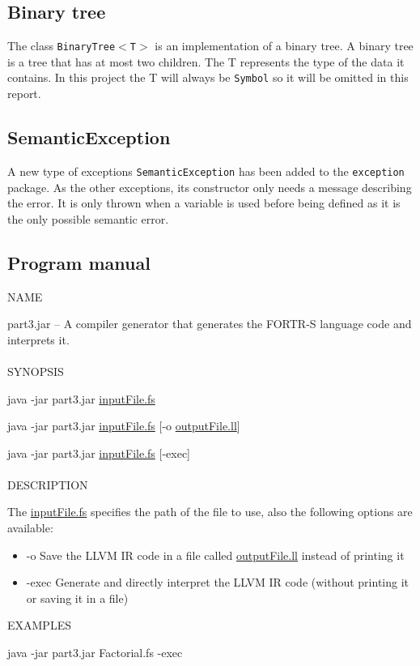 \documentclass{article}
\begin{document}
\subsection{Binary tree}
The class \texttt{BinaryTree$<$T$>$} is an implementation of a binary tree. A binary tree is a tree that has at most two children. The T represents the type of the data it contains. In this project the T will always be \texttt{Symbol} so it will be omitted in this report.

\subsection{SemanticException}
A new type of exceptions \texttt{SemanticException} has been added to the \texttt{exception} package. As the other exceptions, its constructor only needs a message describing the error. It is only thrown when a variable is used before being defined as it is the only possible semantic error. 

\subsection{Program manual}
\noindent NAME

part3.jar -- A compiler generator that generates the FORTR-S language code and interprets it.
\\\\ 
\noindent SYNOPSIS

java -jar part3.jar \underline{inputFile.fs}

java -jar part3.jar \underline{inputFile.fs} [-o \underline{outputFile.ll}]

java -jar part3.jar \underline{inputFile.fs} [-exec] 
\\\\ 
\noindent DESCRIPTION 

The \underline{inputFile.fs} specifies the path of the file to use, also the following options are available:
\begin{itemize}
    \item[] -o \hspace{10pt} Save the LLVM IR code in a file called \underline{outputFile.ll} instead of printing it
    \item[] -exec Generate and directly interpret the LLVM IR code (without printing it or saving it in a file)
\end{itemize}

\noindent EXAMPLES

java -jar part3.jar Factorial.fs -exec
\end{document}
